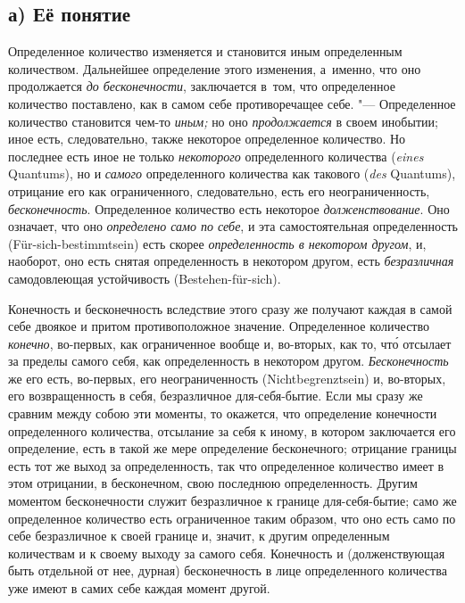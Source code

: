 
\subsection[а) Её понятие]{а) Её понятие}

Определенное количество изменяется и становится иным определенным
количеством. Дальнейшее определение этого изменения, а~именно, что оно
продолжается {\em до бесконечности}, заключается в~том, что определенное
количество поставлено, как в самом себе противоречащее себе. "--- Определенное
количество становится чем-то {\em иным;} но оно {\em продолжается} в своем
инобытии; иное есть, следовательно, также некоторое определенное количество.
Но последнее есть иное не только {\em некоторого} определенного количества ({\em \!eines} Quantums),
но и {\em самого} определенного количества как такового ({\em \!des} Quantums), отрицание его как
ограниченного, следовательно, есть его неограниченность, {\em бесконечность}.
Определенное количество есть некоторое {\em долженствование}. Оно означает, что
оно {\em определено само по себе}, и эта самостоятельная определенность
(Für-sich-bestimmt\-sein) есть скорее {\em определенность в некотором другом}, и,
наоборот, оно есть снятая определенность в некотором другом, есть
{\em безразличная} самодовлеющая устойчивость (Bestehen-für-sich).

Конечность и бесконечность вследствие этого сразу же получают каждая в самой
себе двоякое и притом противоположное значение. Определенное количество
{\em конечно}, во-первых, как ограниченное вообще и, во-вторых, как то, чт\'{о}
отсылает за пределы самого себя, как определенность в некотором другом.
{\em Бесконечность} же его есть, во-первых, его неограниченность (Nicht\-begrenzt\-sein) и, во-вторых,
его возвращенность в себя, безразличное для-себя-бытие. Если мы сразу же
сравним между собою эти моменты, то окажется, что определение конечности
определенного количества, отсылание за себя к иному, в котором заключается его
определение, есть в такой же мере определение бесконечного; отрицание границы
есть тот же выход за определенность, так что определенное количество имеет
в этом отрицании, в бесконечном, свою последнюю определенность. Другим моментом
бесконечности служит безразличное к границе для-себя-бытие; само же
определенное количество есть ограниченное таким образом, что оно есть само по
себе безразличное к своей границе и, значит, к другим определенным количествам
и к своему выходу за самого себя. Конечность и (долженствующая быть отдельной
от нее, дурная) бесконечность в лице определенного количества уже имеют в самих
себе каждая момент другой.

